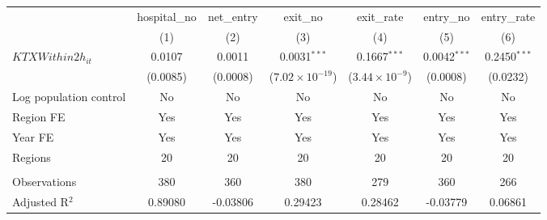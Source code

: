 \begingroup
\centering
\begin{tabular}{lcccccc}
   \toprule
                          & hospital\_no  & net\_entry  & exit\_no                 & exit\_rate              & entry\_no      & entry\_rate \\    
                          & (1)           & (2)         & (3)                      & (4)                     & (5)            & (6)\\  
   \midrule 
   $KTXWithin2h_{it}$     & 0.0107        & 0.0011      & 0.0031$^{***}$           & 0.1667$^{***}$          & 0.0042$^{***}$ & 0.2450$^{***}$\\   
                          & (0.0085)      & (0.0008)    & ($7.02\times 10^{-19}$)  & ($3.44\times 10^{-9}$)  & (0.0008)       & (0.0232)\\   
   Log population control & No            & No          & No                       & No                      & No             & No\\  
   Region FE              & Yes           & Yes         & Yes                      & Yes                     & Yes            & Yes\\  
   Year FE                & Yes           & Yes         & Yes                      & Yes                     & Yes            & Yes\\  
   Regions                & 20            & 20          & 20                       & 20                      & 20             & 20\\  
    \\
   Observations           & 380           & 360         & 380                      & 279                     & 360            & 266\\  
   Adjusted R$^2$         & 0.89080       & -0.03806    & 0.29423                  & 0.28462                 & -0.03779       & 0.06861\\  
   \bottomrule
\end{tabular}
\par\endgroup

